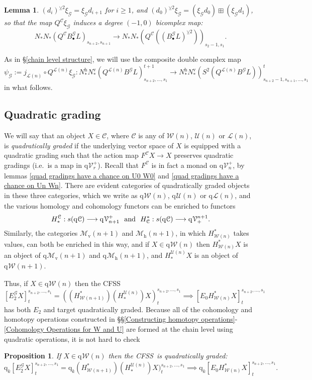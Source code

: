 \documentclass[11pt]{amsart} \renewcommand{\baselinestretch}{1.2}
\theoremstyle{plain}
\newtheorem{lem}[thm]{Lemma}
\newtheorem{prop}[thm]{Proposition}
\numberwithin{equation}{section} %
\theoremstyle{plain}
\newtheorem{lem}[thm]{Lemma}
\newtheorem{prop}[thm]{Proposition}
\numberwithin{equation}{chapter} %
\renewcommand{\to}{\longrightarrow}
\newcommand{\scrG}{\mathscr{G}}
\newcommand{\calU}{\mathcal{U}}
\newcommand{\calL}{\mathcal{L}}
\newcommand{\calV}{\mathcal{V}}
\newcommand{\calw}{\mathcal{W}}
\newcommand{\calu}{\mathcal{U}}
\newcommand{\call}{\mathcal{L}}
\newcommand{\calc}{\mathcal{C}}
\newcommand{\calMv}{\mathcal{M}\dver}
\newcommand{\calMh}{\mathcal{M}\dhor}
\newcommand{\vect}[2]{\calV^{#1}_{#2}}
\newcommand{\BSW}{{\scrG}}
\newcommand{\BSWres}{B^\BSW}%
\newcommand{\quadgrad}[1]{\mathrm{q}_{#1}}
\newcommand{\E}[5]{[E^{#1}_{#2}#3]^{#4}_{#5}}
\newcommand{\Edown}[4]{[E_{#1}#2]^{#3}_{#4}}
\newcommand{\uver}{^\mathrm{v}}
\newcommand{\uhor}{^\mathrm{h}}
\newcommand{\dver}{_\mathrm{v}}
\newcommand{\dhor}{_\mathrm{h}}
\newcommand{\smashcoprod}{\veebar}%
\newcommand{\CFSS}{CFSS}
\newcommand{\SubsectionOrSection}[1]{\subsection{#1}}
\begin{document}
\begin{Comp funct sseqs}
\begin{lem}
$(d_i)^{\smashcoprod 2}\xi_\BSW =\xi_\BSW d_{i+1}$ for $i\geq1$, and $(d_0)^{\smashcoprod 2}\xi_\BSW = (\xi_\BSW d_{0})\boxplus(\xi_\BSW d_{1})$, so that the map $Q^{\calc}\xi_\BSW $ induces a degree $(-1,0)$ bicomplex map:
\[N_*N_*(Q^{\calc}B^\BSW_{\bullet}L)_{s_{n+2},s_{n+1}}\to
  N_*N_*(Q^{\calc}((B^\BSW_{\bullet}L)^{\smashcoprod 2}))_{s_2-1,s_1}.\]
\end{lem}
As in \S\ref{chain level structure}, we will use the composite double complex map
\[\psi_\BSW:=j_{\calL(n)}\circ Q^{\calL(n)}\xi_\BSW:N\uhor_*N\uver_*(Q^{\calL(n)}\BSWres L)_{s_{n+2},\ldots,s_1}^{t+1}\to N\uhor_*N\uver_*(S^2(Q^{\calL(n)}\BSWres L))_{s_{n+2}-1,s_{n+1},\ldots,s_1}^{t}\]
in what follows.


\SubsectionOrSection{Quadratic grading}
\label{Quadratic grading}
We will say that an object $X\in\calc$, where $\calc$ is any of $\calw(n)$, $\calu(n)$ or $\call(n)$, is \emph{quadratically graded} if the underlying vector space of $X$ is equipped with a quadratic grading such that the action map
$F^{\calc}X\to X$ 
preserves quadratic gradings (i.e.\ is a map in $\quadgrad{}\vect{+}{r}$).
Recall that $F^{\calc}$ is in fact a monad on $\quadgrad{}\vect{+}{n}$, by lemmas \ref{quad gradings have a chance on U0 W0} and \ref{quad gradings have a chance on Un Wn}. There are evident categories of quadratically graded objects in these three categories, which we write as $\quadgrad{}\calw(n)$, $\quadgrad{}\calu(n)$ or $\quadgrad{}\call(n)$, and the various homology and cohomology functors can be enriched to functors
\[H_*^{\calc}:s(\quadgrad{}\calc)\to \quadgrad{}\vect{+}{n+1}\textup{ \ and \ }H^*_{\calc}:s(\quadgrad{}\calc)\to \quadgrad{}\vect{n+1}{+}.\]
Similarly, the categories $\calMv(n+1)$ and $\calMh(n+1)$, in which $H^*_{\calw(n)}$ takes values, can both be enriched in this way, and if $X\in\quadgrad{}\calw(n)$ then 
$H^*_{\calw(n)}X$ is an object of $\quadgrad{}\calMv(n+1)$ and $\quadgrad{}\calMh(n+1)$, and 
$H_*^{\calu(n)}X$ is an object of $\quadgrad{}\calw(n+1)$.

Thus, if $X\in\quadgrad{}\calw(n)$ then the \CFSS
\[\E{\BSW}{2}{X}{s_{n+2},\ldots,s_1}{t}=((H^*_{\calw(n+1)})(H_*^{\calU(n)})X)^{s_{n+2},\ldots,s_1}_t\implies \Edown{0}{H^*_{\calw(n)}X}{s_{n+2},\ldots,s_1}{t}\]
has both $E_2$ and target quadratically graded. Because all of the cohomology and homotopy operations constructed in \S\S\ref{Constructing homotopy operations}-\ref{Cohomology Operations for W and U} are formed at the chain level using quadratic operations, it is not hard to check
\begin{prop}
\label{prop: cfsseq is quad graded}
If $X\in\quadgrad{}\calw(n)$ then the \CFSS\ is quadratically graded:
\[\quadgrad{k}\E{\BSW}{2}{X}{s_{n+2},\ldots,s_1}{t}=\quadgrad{k}(H^*_{\calw(n+1)})(H_*^{\calU(n)})X)^{s_{n+2},\ldots,s_1}_t\implies \quadgrad{k}\Edown{0}{H^*_{\calw(n)}X}{s_{n+2},\ldots,s_1}{t}.\]
\end{prop}



\end{Comp funct sseqs}
\end{document}

